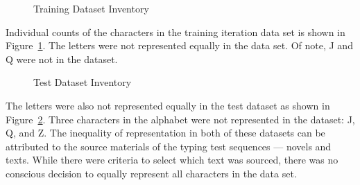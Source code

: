 \documentclass{report}
\begin{document}
\begin{figure}[H]
	\centering
	\caption{Training Dataset Inventory}
	\label{fig:metho-inventory-training}
\end{figure}

Individual counts of the characters in the training iteration data set is shown
in Figure~\ref{fig:metho-inventory-training}. The letters were not represented
equally in the data set. Of note, J and Q were not in the dataset.

\begin{figure}[H]
	\centering
	\caption{Test Dataset Inventory}
	\label{fig:metho-inventory-test}
\end{figure}

The letters were also not represented equally in the test dataset as shown in
Figure~\ref{fig:metho-inventory-test}. Three characters in the alphabet were not
represented in the dataset: J, Q, and Z. The inequality of representation in
both of these datasets can be attributed to the source materials of the typing
test sequences --- novels and texts. While there were criteria to select which
text was sourced, there was no conscious decision to equally represent all
characters in the data set.
\end{document}
